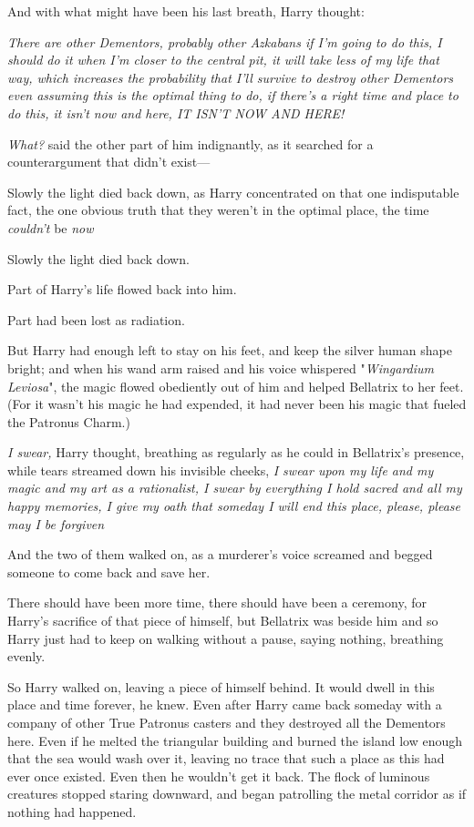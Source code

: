 And with what might have been his last breath, Harry thought:

\emph{There are other Dementors, probably other Azkabans{\el} if I'm going
to do this, I should do it when I'm closer to the central pit, it will take
less of my life that way, which increases the probability that I'll survive to
destroy other Dementors{\el} even assuming this is the optimal thing to do,
if there's a right time and place to do this, it isn't now and here, IT ISN'T
NOW AND HERE!}

\emph{What?} said the other part of him indignantly, as it searched for a
counterargument that didn't exist---

Slowly the light died back down, as Harry concentrated on that one indisputable
fact, the one obvious truth that they weren't in the optimal place, the time
\emph{couldn't} be \emph{now{\el}}

Slowly the light died back down.

Part of Harry's life flowed back into him.

Part had been lost as radiation.

But Harry had enough left to stay on his feet, and keep the silver human shape
bright; and when his wand arm raised and his voice whispered "\emph{Wingardium
Leviosa}", the magic flowed obediently out of him and helped Bellatrix to her
feet. (For it wasn't his magic he had expended, it had never been his magic
that fueled the Patronus Charm.)

\emph{I swear,} Harry thought, breathing as regularly as he could in
Bellatrix's presence, while tears streamed down his invisible cheeks, \emph{I
swear upon my life and my magic and my art as a rationalist, I swear by
everything I hold sacred and all my happy memories, I give my oath that someday
I will end this place, please, please may I be forgiven{\el}}

And the two of them walked on, as a murderer's voice screamed and begged
someone to come back and save her.

There should have been more time, there should have been a ceremony, for
Harry's sacrifice of that piece of himself, but Bellatrix was beside him and so
Harry just had to keep on walking without a pause, saying nothing, breathing
evenly.

So Harry walked on, leaving a piece of himself behind. It would dwell in this
place and time forever, he knew. Even after Harry came back someday with a
company of other True Patronus casters and they destroyed all the Dementors
here. Even if he melted the triangular building and burned the island low
enough that the sea would wash over it, leaving no trace that such a place as
this had ever once existed. Even then he wouldn't get it back.
\sbreak
The flock of luminous creatures stopped staring downward, and began patrolling
the metal corridor as if nothing had happened.

